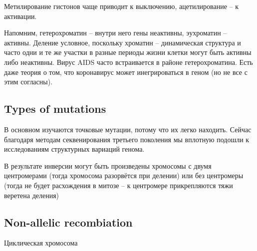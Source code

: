 \documentclass[main.tex]{subfiles}
\begin{document}
Метилирование гистонов чаще приводит к выключению, ацетилирование -- к активации.

Напомним, гетерохроматин -- внутри него гены неактивны, эухроматин -- активны.
Деление условное, поскольку хроматин -- динамическая структура и часто одни и те же участки в разные периоды жизни клетки могут быть активны либо неактивны.
Вирус AIDS часто встраивается в районе гетерохроматина.
Есть даже теория о том, что коронавирус может инегрироваться в геном (но не все с этим согласны).


\subsection{Types of mutations}

В основном изучаются точковые мутации, потому что их легко находить.
Сейчас благодаря методам секвенирования третьего поколения мы вплотную подошли к исследованиям структурных вариаций генома.

В результате инверсии могут быть произведены хромосомы с двумя центромерами (тогда хромосома разорвётся при делении) или без центромеры (тогда не будет расхождения в митозе -- к центромере прикрепляются тяжи веретена деления)

\subsection{Non-allelic recombiation}

Циклическая хромосома 
\end{document}
